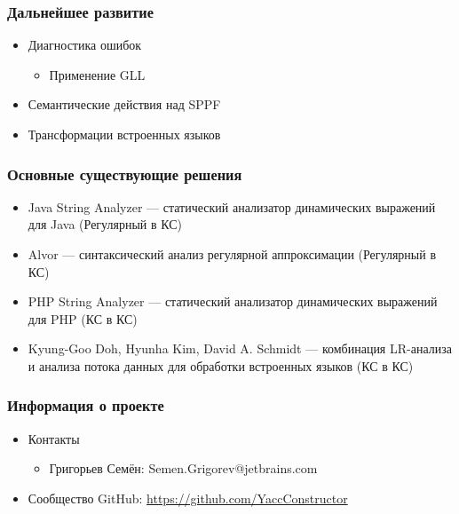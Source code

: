\documentclass{beamer}
\begin{document}
\begin{frame}[fragile]
	\transwipe[direction=90]
	\frametitle{Дальнейшее развитие}
	\begin{itemize}
	    \item Диагностика ошибок
	    \begin{itemize}
	        \item Применение GLL
    	\end{itemize}
    	\item Семантические действия над SPPF
    	\item Трансформации встроенных языков
	\end{itemize}
\end{frame}


\begin{frame}[fragile]
	\transwipe[direction=90]
	\frametitle{Основные существующие решения}
	\begin{itemize}
	    \item Java String Analyzer --- статический анализатор динамических выражений для Java (Регулярный в КС)
	    \item Alvor --- синтаксический анализ регулярной аппроксимации (Регулярный в КС)
  		\item PHP String Analyzer --- статический анализатор динамических выражений для PHP (КС в КС)
	    \item Kyung-Goo Doh, Hyunha Kim, David A. Schmidt --- комбинация LR-анализа и анализа потока данных для обработки встроенных языков (КС в КС)
  \end{itemize}
\end{frame}

\begin{frame}
	\transwipe[direction=90]
	\frametitle{Информация о проекте}
	\begin{itemize}
		\item Контакты 
        \begin{itemize}
            \item Григорьев Семён: Semen.Grigorev@jetbrains.com
        \end{itemize}
		\item Сообщество GitHub: \href{https://github.com/YaccConstructor}{https://github.com/YaccConstructor}
	\end{itemize}
\end{frame}
\end{document}
